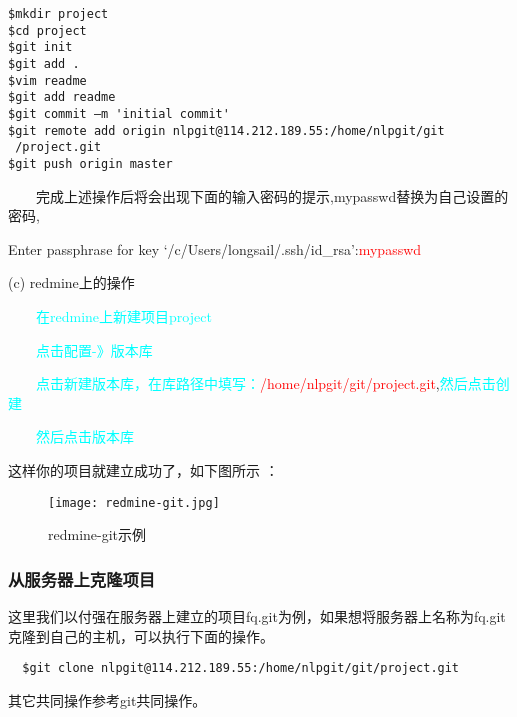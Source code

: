 \begin{lstlisting}
$mkdir project
$cd project
$git init
$git add . 
$vim readme
$git add readme
$git commit –m 'initial commit' 
$git remote add origin nlpgit@114.212.189.55:/home/nlpgit/git
 /project.git
$git push origin master
\end{lstlisting}

 ~~~~完成上述操作后将会出现下面的输入密码的提示,mypasswd替换为自己设置的密码,

Enter passphrase for key ‘/c/Users/longsail/.ssh/id\_rsa’:\textcolor{red}{mypasswd} 

(c) redmine上的操作

~~~~\textcolor{cyan}{在redmine上新建项目project}

~~~~\textcolor{cyan}{点击配置-》版本库}

~~~~\textcolor{cyan}{点击新建版本库，在库路径中填写：}\textcolor{red}{/home/nlpgit/git/project.git},\textcolor{cyan}{然后点击创建}

~~~~\textcolor{cyan}{然后点击版本库}

这样你的项目就建立成功了，如下图所示 ：
\clearpage
\begin{figure}[htpd]
 \centering
 \texttt{[image: redmine-git.jpg]}
 \caption{redmine-git示例}
\end{figure}

\subsubsection{从服务器上克隆项目}

这里我们以付强在服务器上建立的项目fq.git为例，如果想将服务器上名称为fq.git克隆到自己的主机，可以执行下面的操作。
\begin{lstlisting}
  $git clone nlpgit@114.212.189.55:/home/nlpgit/git/project.git
\end{lstlisting}

其它共同操作参考git共同操作。

